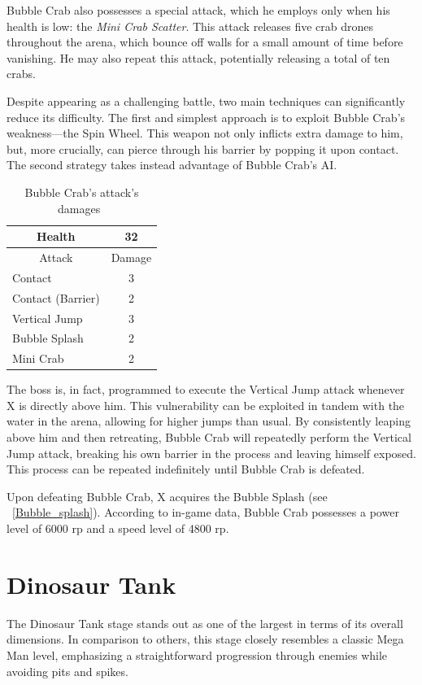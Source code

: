 Bubble Crab also possesses a special attack, which he employs only when his health is low: the \emph{Mini Crab Scatter}. This attack releases five crab drones throughout the arena, which bounce off walls for a small amount of time before vanishing. He may also repeat this attack, potentially releasing a total of ten crabs. 

Despite appearing as a challenging battle, two main techniques can significantly reduce its difficulty. The first and simplest approach is to exploit Bubble Crab's weakness—the Spin Wheel. This weapon not only inflicts extra damage to him, but, more crucially, can pierce through his barrier by popping it upon contact. The second strategy takes instead advantage of Bubble Crab's AI.\begin{table}[htp]
	\centering
	\begin{tabular}[h]{l c}
		\toprule
		\multicolumn{1}{c}{Health}  & 32 \\
		\midrule
		\multicolumn{1}{c}{Attack} & \multicolumn{1}{c}{Damage}\\
		Contact & 3 \\
		Contact (Barrier) & 2\\
		Vertical Jump& 3\\
		Bubble Splash & 2\\
		Mini Crab & 2\\
		\bottomrule
	\end{tabular}
	\caption{Bubble Crab's attack's damages~\cite{wiki:Bubble_Crab,book:Compendium}}
\end{table} The boss is, in fact, programmed to execute the Vertical Jump attack whenever X is directly above him. This vulnerability can be exploited in tandem with the water in the arena, allowing for higher jumps than usual. By consistently leaping above him and then retreating, Bubble Crab will repeatedly perform the Vertical Jump attack, breaking his own barrier in the process and leaving himself exposed. This process can be repeated indefinitely until Bubble Crab is defeated.


Upon defeating Bubble Crab, X acquires the Bubble Splash (see ~\ref{Bubble_splash}). According to in-game data, Bubble Crab possesses a power level of 6000 rp and a speed level of 4800 rp.

\section{Dinosaur Tank}
The Dinosaur Tank stage stands out as one of the largest in terms of its overall dimensions. In comparison to others, this stage closely resembles a classic Mega Man level, emphasizing a straightforward progression through enemies while avoiding pits and spikes. 


